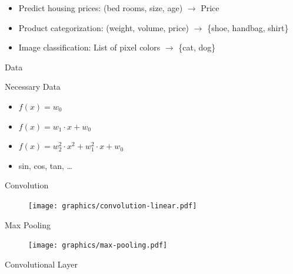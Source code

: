 \documentclass{beamer}
\begin{document}
\begin{frame}{}
    \begin{itemize}[<+->]
        \item Predict housing prices: (bed rooms, size, age) $\rightarrow$ Price
        \item Product categorization: (weight, volume, price) $\rightarrow$ \{shoe, handbag, shirt\}
        \item Image classification: List of pixel colors $\rightarrow$ \{cat, dog\}
    \end{itemize}
\end{frame}

\begin{frame}{}
    \begin{center}
    \Huge Data
    \end{center}
\end{frame}

\begin{frame}{Necessary Data}
    \begin{itemize}
        \item $f(x) = w_0$
        \item $f(x) = w_1 \cdot x + w_0$
        \item $f(x) = w_2^2 \cdot x^2 + w_1^2 \cdot x + w_0$
        \item sin, cos, tan, \dots
    \end{itemize}
\end{frame}

\begin{frame}{Convolution}
\begin{figure}[ht]
    \centering
    \texttt{[image: graphics/convolution-linear.pdf]}
\end{figure}
\end{frame}

\begin{frame}{Max Pooling}
\begin{figure}[ht]
    \centering
    \texttt{[image: graphics/max-pooling.pdf]}
\end{figure}
\end{frame}

\begin{frame}{Convolutional Layer}
\begin{figure}[ht]
    \centering
    
\end{figure}
\end{frame}
\end{document}
